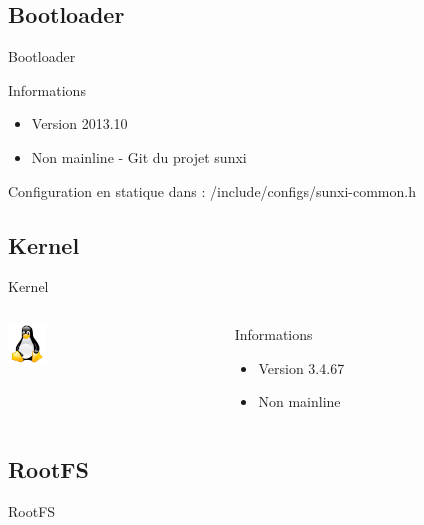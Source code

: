 \documentclass[11pt]{beamer}
\begin{document}
	\subsection{Bootloader}
	\begin{frame}{Bootloader}
		\begin{block}{Informations}
		\begin{itemize}
			\item Version 2013.10
			\item Non mainline - Git du projet sunxi
			\href{https://github.com/linux-sunxi/u-boot-sunxi}{}
		\end{itemize}
	\end{block}
	Configuration en statique dans : /include/configs/sunxi-common.h
	\end{frame}
	
	\subsection{Kernel}
	\begin{frame}{Kernel}
	\begin{columns}[t]
	\begin{column}{5cm}
	\includegraphics[width=1cm]{commons/tux.png}
	\end{column}
	\begin{column}{5cm}
		\begin{block}{Informations}
		\begin{itemize}
			\item Version 3.4.67
			\item Non mainline \\
			\href{https://github.com/linux-sunxi/linux-sunxi}{}
		\end{itemize}
	\end{block}
	\end{column}
		\end{columns}
	\end{frame}
	
	\subsection{RootFS}
	\begin{frame}{RootFS}
		\begin{center}
		
		\end{center}
	\end{frame}
	
\end{document}
